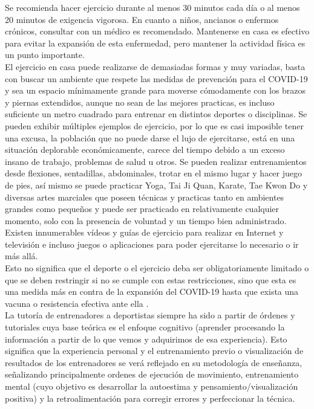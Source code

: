 Se recomienda hacer ejercicio durante al menos 30 minutos cada día o al menos 20 minutos de exigencia vigorosa. En cuanto a niños, ancianos o enfermos crónicos, consultar con un médico es recomendado. Mantenerse en casa es efectivo para evitar la expansión de esta enfermedad, pero mantener la actividad física es un punto importante.\\

El ejercicio en casa puede realizarse de demasiadas formas y muy variadas, basta con buscar un ambiente que respete las medidas de prevención para el COVID-19 y sea un espacio mínimamente grande para moverse cómodamente con los brazos y piernas extendidos, aunque no sean de las mejores practicas, es incluso suficiente un metro cuadrado para entrenar en distintos deportes o disciplinas. Se pueden exhibir múltiples ejemplos de ejercicio, por lo que es casi imposible tener una excusa, la población que no puede darse el lujo de ejercitarse, está en una situación deplorable económicamente, carece del tiempo debido a un exceso insano de trabajo, problemas de salud u otros.
Se pueden realizar entrenamientos desde flexiones, sentadillas, abdominales, trotar en el mismo lugar y hacer juego de pies, así mismo se puede practicar Yoga, Tai Ji Quan, Karate, Tae Kwon Do y diversas artes marciales que poseen técnicas y practicas tanto en ambientes grandes como pequeños y puede ser practicado en relativamente cualquier momento, solo con la presencia de voluntad y un tiempo bien administrado. Existen innumerables vídeos y guías de ejercicio para realizar en Internet y televisión e incluso juegos o aplicaciones para poder ejercitarse lo necesario o ir más allá.\\

Esto no significa que el deporte o el ejercicio deba ser obligatoriamente limitado o que se deben restringir si no se cumple con estas restricciones, sino que esta es una medida más en contra de la expansión del COVID-19 hasta que exista una vacuna o resistencia efectiva ante ella \cite{Chen}. \\

La tutoría de entrenadores a deportistas siempre ha sido a partir de órdenes y tutoriales cuya base teórica es el enfoque cognitivo (aprender procesando la información a partir de lo que vemos y adquirimos de esa experiencia). Esto significa que la experiencia personal y el entrenamiento previo o visualización de resultados de los entrenadores se verá reflejado en su metodología de enseñanza, señalizando principalmente ordenes de ejecución de movimiento, entrenamiento mental (cuyo objetivo es desarrollar la autoestima y pensamiento/visualización positiva) y la retroalimentación para corregir errores y perfeccionar la técnica\cite{raiola2017motor}. \\
